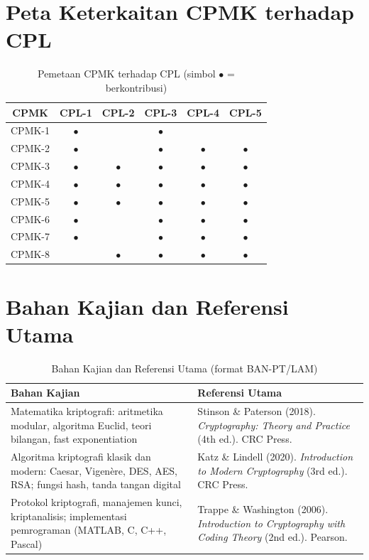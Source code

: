 \documentclass[12pt,a4paper]{article}
\begin{document}
\section{Peta Keterkaitan CPMK terhadap CPL}

\begin{table}[!htbp]
\centering
\small
\begin{tabular}{|c|c|c|c|c|c|}
\hline
\textbf{CPMK} & \textbf{CPL-1} & \textbf{CPL-2} & \textbf{CPL-3} & \textbf{CPL-4} & \textbf{CPL-5} \\
\hline
CPMK-1 & $\bullet$ & & $\bullet$ & & \\
CPMK-2 & $\bullet$ & & $\bullet$ & $\bullet$ & $\bullet$ \\
CPMK-3 & $\bullet$ & $\bullet$ & $\bullet$ & $\bullet$ & $\bullet$ \\
CPMK-4 & $\bullet$ & $\bullet$ & $\bullet$ & $\bullet$ & $\bullet$ \\
CPMK-5 & $\bullet$ & $\bullet$ & $\bullet$ & $\bullet$ & $\bullet$ \\
CPMK-6 & $\bullet$ & & $\bullet$ & $\bullet$ & $\bullet$ \\
CPMK-7 & $\bullet$ & & $\bullet$ & $\bullet$ & $\bullet$ \\
CPMK-8 & & $\bullet$ & $\bullet$ & $\bullet$ & $\bullet$ \\
\hline
\end{tabular}
\caption{Pemetaan CPMK terhadap CPL (simbol $\bullet$ = berkontribusi)}
\end{table}

\section{Bahan Kajian dan Referensi Utama}

\begin{table}[!htbp]
\centering
\small
\begin{tabular}{|p{5.5cm}|p{7.5cm}|}
\hline
\textbf{Bahan Kajian} & \textbf{Referensi Utama} \\
\hline
Matematika kriptografi: aritmetika modular, algoritma Euclid, teori bilangan, fast exponentiation & Stinson \& Paterson (2018). \textit{Cryptography: Theory and Practice} (4th ed.). CRC Press. \\
\hline
Algoritma kriptografi klasik dan modern: Caesar, Vigenère, DES, AES, RSA; fungsi hash, tanda tangan digital & Katz \& Lindell (2020). \textit{Introduction to Modern Cryptography} (3rd ed.). CRC Press. \\
\hline
Protokol kriptografi, manajemen kunci, kriptanalisis; implementasi pemrograman (MATLAB, C, C++, Pascal) & Trappe \& Washington (2006). \textit{Introduction to Cryptography with Coding Theory} (2nd ed.). Pearson. \\
\hline
\end{tabular}
\caption{Bahan Kajian dan Referensi Utama (format BAN-PT/LAM)}
\end{table}
\end{document}
